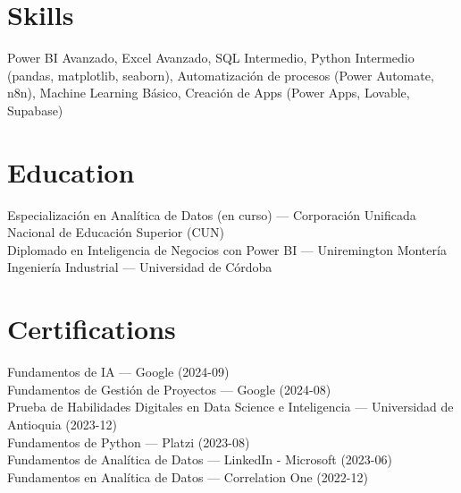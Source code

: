 \documentclass[11pt]{article}
\begin{document}
\section*{Skills}
Power BI Avanzado, Excel Avanzado, SQL Intermedio, Python Intermedio (pandas, matplotlib, seaborn), Automatización de procesos (Power Automate, n8n), Machine Learning Básico, Creación de Apps (Power Apps, Lovable, Supabase)

\section*{Education}
Especialización en Analítica de Datos (en curso) --- Corporación Unificada Nacional de Educación Superior (CUN)\\
Diplomado en Inteligencia de Negocios con Power BI --- Uniremington Montería\\
Ingeniería Industrial --- Universidad de Córdoba\\


\section*{Certifications}
Fundamentos de IA --- Google (2024-09)\\
Fundamentos de Gestión de Proyectos --- Google (2024-08)\\
Prueba de Habilidades Digitales en Data Science e Inteligencia --- Universidad de Antioquia (2023-12)\\
Fundamentos de Python --- Platzi (2023-08)\\
Fundamentos de Analítica de Datos --- LinkedIn - Microsoft (2023-06)\\
Fundamentos en Analítica de Datos --- Correlation One (2022-12)\\
\end{document}
